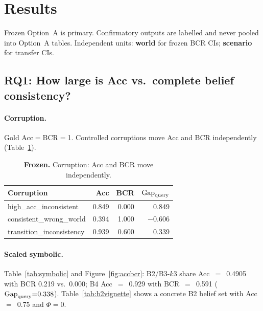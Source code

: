 \section{Results}
\label{sec:results}

Frozen Option~A is primary. Confirmatory outputs are labelled and never pooled into Option~A tables. Independent units: \textbf{world} for frozen BCR CIs; \textbf{scenario} for transfer CIs.

\subsection{RQ1: How large is Acc vs.\ complete belief consistency?}

\paragraph{Corruption.} Gold Acc$=$BCR$=$1. Controlled corruptions move Acc and BCR independently (Table~\ref{tab:corruption}).

\begin{table}[t]
\centering
\caption{\textbf{Frozen.} Corruption: Acc and BCR move independently.}
\label{tab:corruption}
\small
\begin{tabular}{lrrr}
\toprule
Corruption & Acc & BCR & $\mathrm{Gap}_{\mathrm{query}}$ \\
\midrule
high\_acc\_inconsistent & 0.849 & 0.000 & 0.849 \\
consistent\_wrong\_world & 0.394 & 1.000 & $-$0.606 \\
transition\_inconsistency & 0.939 & 0.600 & 0.339 \\
\bottomrule
\end{tabular}
\end{table}

\paragraph{Scaled symbolic.} Table~\ref{tab:symbolic} and Figure~\ref{fig:accbcr}: B2/B3-$k3$ share Acc~$=$~0.4905 with BCR 0.219 vs.\ 0.000; B4 Acc~$=$~0.929 with BCR~$=$~0.591 ($\mathrm{Gap}_{\mathrm{query}}{=}0.338$). Table~\ref{tab:b2vignette} shows a concrete B2 belief set with Acc~$=$~0.75 and $\Phi{=}0$.

